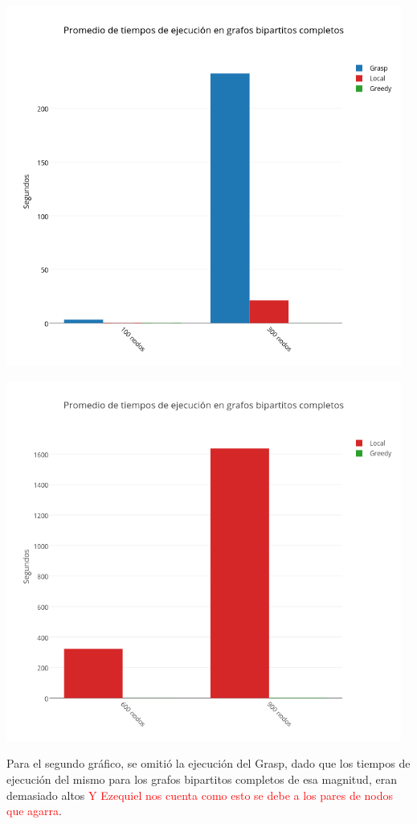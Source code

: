 \begin{center}
 	\includegraphics[width=13cm, keepaspectratio=yes]{imagenes/coliseo/Bipartite1.png}

 	\includegraphics[width=13cm, keepaspectratio=yes]{imagenes/coliseo/Bipartite2.png}
\end{center}

Para el segundo gráfico, se omitió la ejecución del Grasp, dado que los tiempos de ejecución del mismo para los grafos bipartitos completos de esa magnitud, eran demasiado altos \textcolor{red}{Y Ezequiel nos cuenta como esto se debe a los pares de nodos que agarra}.

